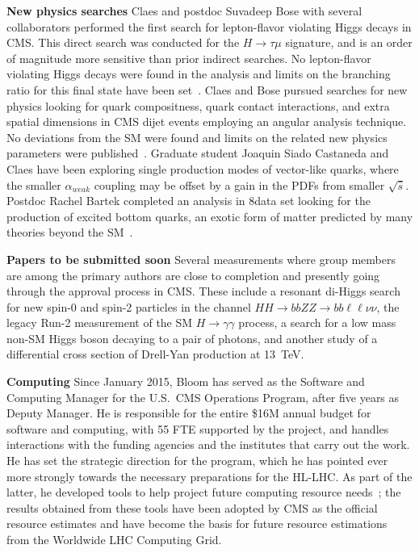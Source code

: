 {\bf New physics searches}
Claes and postdoc Suvadeep Bose with several collaborators performed the first search for lepton-flavor violating Higgs decays in CMS. This direct search was conducted for the $H\rightarrow \tau\mu$ signature, and is an order of magnitude more sensitive than prior indirect searches. No lepton-flavor violating Higgs decays were found in the analysis and limits on the branching ratio for this final state have been set~\cite{bib:higgs-LFV}.
%
Claes and Bose pursued searches for new physics looking for quark compositness, quark contact interactions, and extra spatial dimensions in CMS dijet events employing an angular analysis technique. No deviations from the SM were found and limits on the related new physics parameters were published~\cite{bib:quark-compositness-etc}.
%
Graduate student Joaquin Siado Castaneda and Claes have been exploring single production modes of vector-like quarks, where the smaller $\alpha_{weak}$ coupling may be offset by a gain in the PDFs from smaller $\sqrt{\hat{s}}$.
%
Postdoc Rachel Bartek completed an analysis in 8\TeV data set looking for the production of excited bottom quarks, an exotic form of matter predicted by many theories beyond the SM~\cite{bib:bstar}. 

{\bf Papers to be submitted soon} Several measurements where group members are among the primary authors are close to completion and presently going through the approval process in CMS. These include a resonant di-Higgs search for new spin-0 and spin-2 particles in the channel $HH\to bbZZ\to bb\ell\ell\nu\nu$, the legacy Run-2 measurement of the SM $H\to\gamma\gamma$ process, a search for a low mass non-SM Higgs boson decaying to a pair of photons, and another study of a differential cross section of Drell-Yan production at 13~TeV. 

{\bf Computing} Since January 2015, Bloom has served as the Software and
Computing Manager for the U.S.~CMS Operations Program, after
five years as Deputy Manager.  He is responsible for the entire \$16M
annual budget for software and computing, with 55 FTE
supported by the project, and handles interactions with the funding
agencies and the institutes that carry out the work.  He
has set the strategic direction for the program, which he has pointed ever
more strongly towards the necessary preparations for the HL-LHC.  As part
of the latter, he developed tools to help project future computing resource
needs~\cite{bib:resource-modeling}; the results obtained from these tools
have been adopted by CMS as the official resource estimates and have
become the basis for future resource estimations from the Worldwide LHC
Computing Grid.

